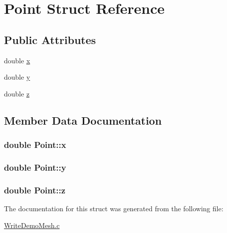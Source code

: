 \hypertarget{struct_point}{
\section{Point Struct Reference}
\label{struct_point}
}
\subsection*{Public Attributes}
\begin{DoxyCompactItemize}
\item 
double \hyperlink{struct_point_ab99c56589bc8ad5fa5071387110a5bc7}{x}
\item 
double \hyperlink{struct_point_afa38be143ae800e6ad69ce8ed4df62d8}{y}
\item 
double \hyperlink{struct_point_a05ba3b1dfcb19430582ae953cbbfbded}{z}
\end{DoxyCompactItemize}


\subsection{Member Data Documentation}
\hypertarget{struct_point_ab99c56589bc8ad5fa5071387110a5bc7}{
\subsubsection[{x}]{\setlength{\rightskip}{0pt plus 5cm}double {\bf Point::x}}}
\label{struct_point_ab99c56589bc8ad5fa5071387110a5bc7}
\hypertarget{struct_point_afa38be143ae800e6ad69ce8ed4df62d8}{
\subsubsection[{y}]{\setlength{\rightskip}{0pt plus 5cm}double {\bf Point::y}}}
\label{struct_point_afa38be143ae800e6ad69ce8ed4df62d8}
\hypertarget{struct_point_a05ba3b1dfcb19430582ae953cbbfbded}{
\subsubsection[{z}]{\setlength{\rightskip}{0pt plus 5cm}double {\bf Point::z}}}
\label{struct_point_a05ba3b1dfcb19430582ae953cbbfbded}


The documentation for this struct was generated from the following file:\begin{DoxyCompactItemize}
\item 
\hyperlink{_write_demo_mesh_8c}{WriteDemoMesh.c}\end{DoxyCompactItemize}
